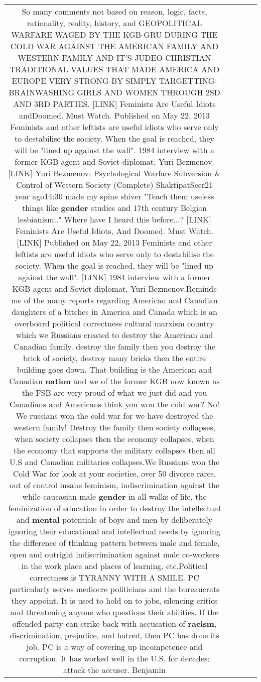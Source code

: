\documentclass[11pt]{article}
\newlength\mylength
\begin{document}
\begin{center}
\begin{longtable}{|C{.65\mylength}|C{.30\mylength}|C{.12\mylength}|C{.12\mylength}|C{.12\mylength}|}
  \small So many comments not based on reason, logic, facts, rationality, reality, history, and GEOPOLITICAL WARFARE WAGED BY THE KGB-GRU DURING THE COLD WAR AGAINST THE AMERICAN FAMILY AND WESTERN FAMILY AND IT'S JUDEO-CHRISTIAN TRADITIONAL VALUES THAT MADE AMERICA AND EUROPE VERY STRONG BY SIMPLY TARGETTING-BRAINWASHING GIRLS AND WOMEN THROUGH 2SD AND 3RD PARTIES.  [LINK]   Feminists Are Useful Idiots andDoomed. Must Watch. Published on May 22, 2013  Feminists and other leftists are useful idiots who serve only to destabilise the society. When the goal is reached, they will be "lined up against the wall". 1984 interview with a former KGB agent and Soviet diplomat, Yuri Bezmenov. [LINK]   Yuri Bezmenov: Psychological Warfare Subversion \& Control of Western Society (Complete) ShaktipatSeer21 year ago14:30 made my spine shiver "Teach them useless things like \textbf{gender} studies and 17th century Belgian lesbianism.." Where have I heard this before...? [LINK] Feminists Are Useful Idiots, And Doomed. Must Watch.   [LINK] Published on May 22, 2013  Feminists and other leftists are useful idiots who serve only to destabilise the society. When the goal is reached, they will be "lined up against the wall".  [LINK] 1984 interview with a former KGB agent and Soviet diplomat, Yuri Bezmenov.Reminds me of the many reports regarding American and Canadian daughters of a bitches in America and Canada which is an overboard political correctness cultural marxism country which we Russians created to destroy the American and Canadian family. destroy the family then you destroy the brick of society, destroy many bricks then the entire building goes down. That building is the American and Canadian \textbf{nation} and we of the former KGB now known as the FSB are very proud of what we just did and you Canadians and Americans think you won the cold war? No! We russians won the cold war for we have destroyed the western family! Destroy the family then society collapses, when society collapses then the economy collapses, when the economy that supports the military collapses then all U.S and Canadian militaries collapses.We Russians won the Cold War for look at your societies, over 50 divorce rares, out of control insane feminism, indiscrimination against the while caucasian male \textbf{gender} in all walks of life, the feminization of education in order to destroy  the intellectual and \textbf{mental} potentials of boys and men by deliberately ignoring their educational and intellectual needs by ignoring the difference of thinking pattern between male and female, open and outright  indiscrimination against male co-workers in the work place and places of learning, etc.Political correctness is TYRANNY WITH A SMILE. PC particularly serves mediocre politicians and the bureaucrats they appoint.  It is used to hold on to jobs, silencing critics and threatening anyone who questions their abilities.  If the offended party can strike back with accusation of \textbf{racism}, discrimination, prejudice, and hatred, then PC has done its job.  PC is a way of covering up incompetence and corruption.  It has worked well in the U.S. for decades: attack the accuser.  Benjamin 
\end{longtable}
\end{center}
\end{document}
